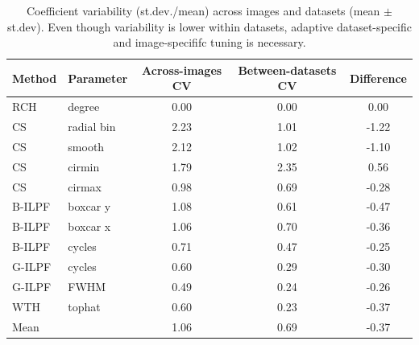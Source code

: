 \documentclass[iucr]{iucrjournals}
\begin{document}


\begin{table}[t]
\centering
\small
\caption{Coefficient variability (st.dev./mean) across images and datasets (mean $\pm$ st.dev). Even though variability is lower within datasets, adaptive dataset-specific and image-specififc tuning is necessary.}
\label{tab:summary_total_variability}
\begin{tabular}{llccc}
\toprule
Method & Parameter & Across-images CV & Between-datasets CV & Difference \\
\midrule

RCH & degree & 0.00 & 0.00 & 0.00 \\
CS & radial bin & 2.23 & 1.01 & -1.22 \\
CS & smooth & 2.12 & 1.02 & -1.10 \\
CS & cirmin & 1.79 & 2.35 & 0.56 \\
CS & cirmax & 0.98 & 0.69 & -0.28 \\
B-ILPF & boxcar y & 1.08 & 0.61 & -0.47 \\
B-ILPF & boxcar x & 1.06 & 0.70 & -0.36 \\
B-ILPF & cycles & 0.71 & 0.47 & -0.25 \\
G-ILPF & cycles & 0.60 & 0.29 & -0.30 \\
G-ILPF & FWHM & 0.49 & 0.24 & -0.26 \\
WTH & tophat & 0.60 & 0.23 & -0.37 \\
\midrule
Mean &  & 1.06 & 0.69 & -0.37 \\

\bottomrule
\end{tabular}
\end{table}
\end{document}

